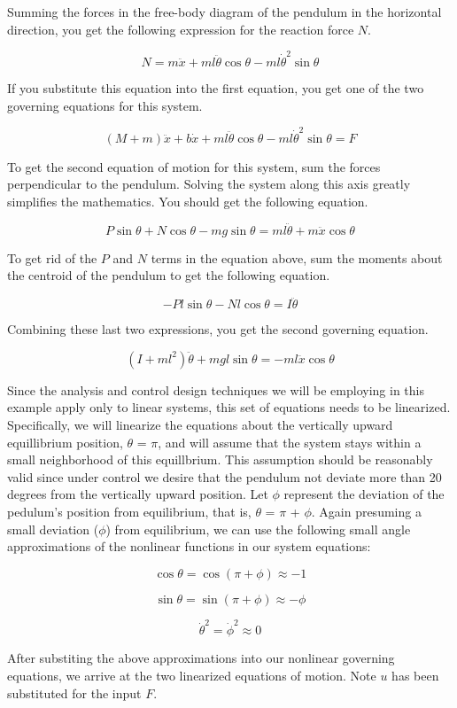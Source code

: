 \documentclass{report}
\begin{document}
Summing the forces in the free-body diagram of the pendulum in the horizontal direction, you get the following expression for the reaction force $N$.

$$ N= m\ddot{x}+ml\ddot{\theta}\cos\theta-ml\dot{\theta}^2\sin\theta $$

If you substitute this equation into the first equation, you get one of the two governing equations for this system.

$$(M+m)\ddot{x}+b\dot{x}+ml\ddot{\theta}\cos\theta-ml\dot{\theta}^2\sin\theta=F $$

To get the second equation of motion for this system, sum the forces perpendicular to the pendulum. Solving the system along this axis greatly simplifies the mathematics. You should get the following equation.

$$P\sin\theta+N\cos\theta-mg\sin\theta=ml\ddot{\theta}+m\ddot{x}\cos\theta$$

To get rid of the $P$ and $N$ terms in the equation above, sum the moments about the centroid of the pendulum to get the following equation.

$$-Pl\sin\theta-Nl\cos\theta=I\ddot{\theta}$$

Combining these last two expressions, you get the second governing equation.

$$(I+ml^2)\ddot{\theta}+mgl\sin\theta=-ml\ddot{x}\cos\theta $$

Since the analysis and control design techniques we will be employing in this example apply only to linear systems, this set of equations needs to be linearized. Specifically, we will linearize the equations about the vertically upward equillibrium position, $\theta$ = $\pi$, and will assume that the system stays within a small neighborhood of this equillbrium. This assumption should be reasonably valid since under control we desire that the pendulum not deviate more than 20 degrees from the vertically upward position. Let $\phi$ represent the deviation of the pedulum's position from equilibrium, that is, $\theta$ = $\pi$ + $\phi$. Again presuming a small deviation ($\phi$) from equilibrium, we can use the following small angle approximations of the nonlinear functions in our system equations:

$$ \cos \theta = \cos(\pi + \phi) \approx -1 $$

$$ \sin \theta = \sin(\pi + \phi) \approx -\phi $$

$$ \dot{\theta}^2 = \dot{\phi}^2 \approx 0 $$

After substiting the above approximations into our nonlinear governing equations, we arrive at the two linearized equations of motion. Note $u$ has been substituted for the input $F$.
\end{document}
